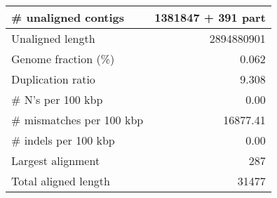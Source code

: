 \documentclass[12pt,a4paper]{article}
\begin{document}
\begin{table}[ht]
\begin{center}
\begin{tabular}{|l*{1}{|r}|}
\# unaligned contigs & 1381847 + 391 part \\ \hline
Unaligned length & 2894880901 \\ \hline
Genome fraction (\%) & 0.062 \\ \hline
Duplication ratio & 9.308 \\ \hline
\# N's per 100 kbp & 0.00 \\ \hline
\# mismatches per 100 kbp & 16877.41 \\ \hline
\# indels per 100 kbp & 0.00 \\ \hline
Largest alignment & 287 \\ \hline
Total aligned length & 31477 \\ \hline
\end{tabular}
\end{center}
\end{table}
\end{document}
